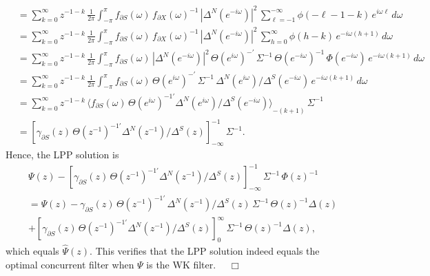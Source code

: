 \documentclass[a4paper]{book}
\begin{document}
\begin{align*}
 & =  \sum_{k = 0}^{\infty}    z^{-1-k} \,  \frac{1}{2 \pi} \int_{-\pi}^{\pi}  
 f_{ \partial S}(\omega)   \,  { f_{\partial X} (\omega)}^{-1} \, 
  {| \Delta^N (e^{-i \omega}) |}^2 \, 
   \sum_{\ell = -1}^{-\infty}  \phi (-\ell-1-k)   \, e^{i \omega \ell} \, d\omega   \\
 & =  \sum_{k = 0}^{\infty}   z^{-1-k} \,  \frac{1}{2 \pi} \int_{-\pi}^{\pi}  
f_{ \partial S}(\omega)   \,  { f_{\partial X} (\omega)}^{-1} \, 
  {| \Delta^N (e^{-i \omega}) |}^2 
\,  \sum_{h = 0}^{\infty}   \phi (h-k)   \, e^{-i \omega (h+1)} \, d\omega  \\
 & =   \sum_{k = 0}^{\infty}   z^{-1-k} \,  \frac{1}{2 \pi} \int_{-\pi}^{\pi}  
f_{ \partial S}(\omega)   \,  {| \Delta^N (e^{-i \omega}) |}^2 \, 
     {  \Theta (e^{i \omega}) }^{- \prime} \, \Sigma^{-1} \,
    {  \Theta (e^{-i \omega}) }^{-1}
\,   \Phi (e^{-i \omega}) \, e^{-i \omega (k+1) }  \, d\omega  \\
 & =   \sum_{k = 0}^{\infty}   z^{-1-k} \,  \frac{1}{2 \pi} \int_{-\pi}^{\pi}  
f_{ \partial S}(\omega) \,  { \Theta (e^{i \omega}) }^{- \prime} \, \Sigma^{-1} \,
  \Delta^N (e^{i \omega})/ \Delta^S (e^{-i \omega})
\,  e^{-i \omega (k+1) }  \, d\omega  \\
 & =   \sum_{k = 0}^{\infty}   z^{-1-k} \,  { \langle    f_{ \partial S}(\omega) \, 
    {  \Theta (e^{i \omega}) }^{-1 \prime} 
    \Delta^N (e^{i \omega})/ \Delta^S (e^{-i \omega})  \rangle  }_{-(k+1) } 
     \, \Sigma^{-1}  \\
 & =   { [  \gamma_{\partial S} (z)  \, 
    {  \Theta (z^{-1}) }^{-1 \prime} 
    \Delta^N (z^{-1})/ \Delta^S (z) ]}_{-\infty}^{-1}  \, \Sigma^{-1}.
\end{align*}
 Hence, the LPP solution is
\begin{align*}
  & \Psi (z) - { [  \gamma_{\partial S} (z)  \, 
    {  \Theta (z^{-1}) }^{-1 \prime} \Delta^N (z^{-1})/ \Delta^S (z)
    ]}_{-\infty}^{-1}  \, \Sigma^{-1} \,     { \Phi (z) }^{-1}  \\
  & =  \Psi (z) -  \gamma_{\partial S} (z)  \, 
    {  \Theta (z^{-1}) }^{-1 \prime}  \, \Delta^N (z^{-1})/ \Delta^S (z) \,
     \Sigma^{-1} \,
    { \Theta (z) }^{-1} \Delta (z)  \\
 &    +  { [  \gamma_{\partial S} (z)  \, 
    {  \Theta (z^{-1}) }^{-1 \prime}  \Delta^N (z^{-1})/ \Delta^S (z)
     ]}_{0}^{\infty}  \, \Sigma^{-1} \,
    { \Theta (z) }^{-1} \Delta (z),
\end{align*}
  which equals $\widehat{\Psi} (z)$.
  This verifies that the LPP solution indeed equals the optimal concurrent
  filter when $\Psi $ is the WK filter.
$\quad \Box$
\end{document}
